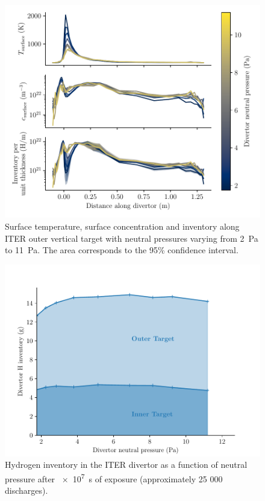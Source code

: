 \begin{figure}[h!]
    \centering
    \includegraphics[width=\linewidth]{Figures/divertor/ITER/inventory_along_outer_divertor.pdf}
    \caption{Surface temperature, surface concentration and inventory along ITER outer vertical target with neutral pressures varying from \SI{2}{Pa} to \SI{11}{Pa}. The area corresponds to the 95\% confidence interval.}
    \label{fig: distrib outer target}
\end{figure}


\begin{figure}[h]
    \centering
    \includegraphics[width=\linewidth]{Figures/divertor/ITER/inventory_vs_divertor_pressure.pdf}
    \caption{Hydrogen inventory in the ITER divertor as a function of neutral pressure after \SI{e7}{s} of exposure (approximately 25 000 discharges).}
    \label{fig: inventory vs neutral pressure}
\end{figure}


